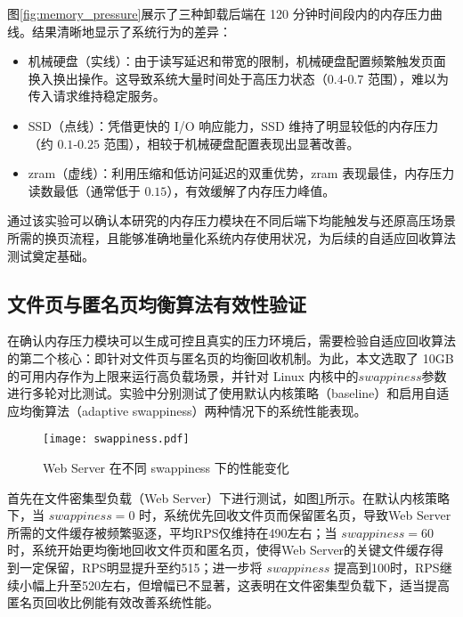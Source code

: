 图\ref{fig:memory_pressure}展示了三种卸载后端在 120 分钟时间段内的内存压力曲线。结果清晰地显示了系统行为的差异：
\begin{itemize}
    \item 机械硬盘（实线）：由于读写延迟和带宽的限制，机械硬盘配置频繁触发页面换入换出操作。这导致系统大量时间处于高压力状态（$0.4$-$0.7$ 范围），难以为传入请求维持稳定服务。
    \item SSD（点线）：凭借更快的 I/O 响应能力，SSD 维持了明显较低的内存压力（约 $0.1$-$0.25$ 范围），相较于机械硬盘配置表现出显著改善。
    \item zram（虚线）：利用压缩和低访问延迟的双重优势，zram 表现最佳，内存压力读数最低（通常低于 $0.15$），有效缓解了内存压力峰值。
\end{itemize}

通过该实验可以确认本研究的内存压力模块在不同后端下均能触发与还原高压场景所需的换页流程，且能够准确地量化系统内存使用状况，为后续的自适应回收算法测试奠定基础。


\subsection{文件页与匿名页均衡算法有效性验证}
\label{sec:file_page_anonymous_page_balance_algorithm_validation}

在确认内存压力模块可以生成可控且真实的压力环境后，需要检验自适应回收算法的第二个核心：即针对文件页与匿名页的均衡回收机制。为此，本文选取了 10GB 的可用内存作为上限来运行高负载场景，并针对 Linux 内核中的\(swappiness\)参数进行多轮对比测试。实验中分别测试了使用默认内核策略（baseline）和启用自适应均衡算法（adaptive swappiness）两种情况下的系统性能表现。

\begin{figure}[htbp]
    \centering
    \texttt{[image: swappiness.pdf]}
    \caption{Web Server 在不同  swappiness  下的性能变化}
    \label{fig:web_server_swappiness}
\end{figure}

首先在文件密集型负载（Web Server）下进行测试，如图\ref{fig:web_server_swappiness}所示。在默认内核策略下，当 \(swappiness=0\) 时，系统优先回收文件页而保留匿名页，导致Web Server所需的文件缓存被频繁驱逐，平均RPS仅维持在490左右；当 \(swappiness=60\) 时，系统开始更均衡地回收文件页和匿名页，使得Web Server的关键文件缓存得到一定保留，RPS明显提升至约515；进一步将 \(swappiness\) 提高到100时，RPS继续小幅上升至520左右，但增幅已不显著，这表明在文件密集型负载下，适当提高匿名页回收比例能有效改善系统性能。


